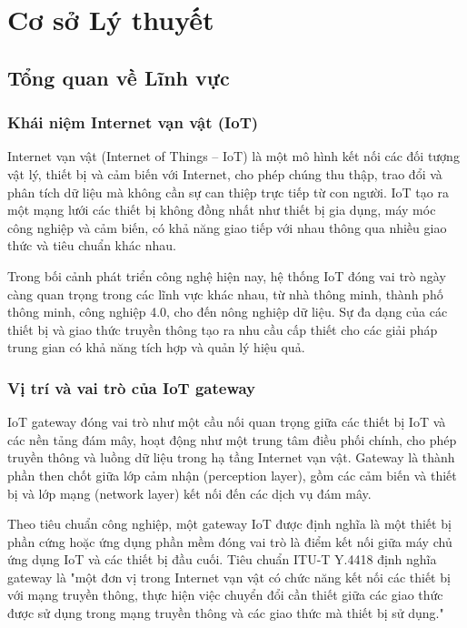 \chapter{Cơ sở Lý thuyết}
    \section{Tổng quan về Lĩnh vực}
        \subsection{Khái niệm Internet vạn vật (IoT)}
            Internet vạn vật (Internet of Things – IoT) là một mô hình kết nối các đối tượng vật lý, thiết bị và cảm biến với Internet, cho phép chúng thu thập, trao đổi và phân tích dữ liệu mà không cần sự can thiệp trực tiếp từ con người. IoT tạo ra một mạng lưới các thiết bị không đồng nhất như thiết bị gia dụng, máy móc công nghiệp và cảm biến, có khả năng giao tiếp với nhau thông qua nhiều giao thức và tiêu chuẩn khác nhau.

            Trong bối cảnh phát triển công nghệ hiện nay, hệ thống IoT đóng vai trò ngày càng quan trọng trong các lĩnh vực khác nhau, từ nhà thông minh, thành phố thông minh, công nghiệp 4.0, cho đến nông nghiệp dữ liệu. Sự đa dạng của các thiết bị và giao thức truyền thông tạo ra nhu cầu cấp thiết cho các giải pháp trung gian có khả năng tích hợp và quản lý hiệu quả.


        \subsection{Vị trí và vai trò của IoT gateway}
            IoT gateway đóng vai trò như một cầu nối quan trọng giữa các thiết bị IoT và các nền tảng đám mây, hoạt động như một trung tâm điều phối chính, cho phép truyền thông và luồng dữ liệu trong hạ tầng Internet vạn vật. Gateway là thành phần then chốt giữa lớp cảm nhận (perception layer), gồm các cảm biến và thiết bị và lớp mạng (network layer) kết nối đến các dịch vụ đám mây.

            Theo tiêu chuẩn công nghiệp, một gateway IoT được định nghĩa là một thiết bị phần cứng hoặc ứng dụng phần mềm đóng vai trò là điểm kết nối giữa máy chủ ứng dụng IoT và các thiết bị đầu cuối. Tiêu chuẩn ITU-T Y.4418 định nghĩa gateway là "một đơn vị trong Internet vạn vật có chức năng kết nối các thiết bị với mạng truyền thông, thực hiện việc chuyển đổi cần thiết giữa các giao thức được sử dụng trong mạng truyền thông và các giao thức mà thiết bị sử dụng."


